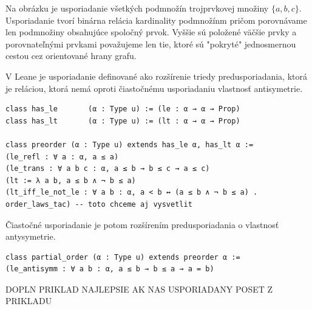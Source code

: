 \documentclass[a4paper,10pt,oneside]{report}%
\begin{document}
    Na obrázku je usporiadanie všetkých podmnožín trojprvkovej množiny $\{ a,b,c \}$.
    Usporiadanie tvorí binárna relácia kardinality podmnožínm pričom porovnávame
len podmnožiny obsahujúce spoločný prvok.
    Vyššie sú položené väčšie prvky a porovnateľnými prvkami považujeme len tie,
ktoré sú "pokryté" jednosmernou cestou cez orientované hrany grafu.

    V Leane je usporiadanie definované ako rozšírenie triedy predusporiadania, ktorá
je reláciou, ktorá nemá oproti čiastočnému usporiadaniu vlastnosť antisymetrie.

\begin{lstlisting}
class has_le       (α : Type u) := (le : α → α → Prop)
class has_lt       (α : Type u) := (lt : α → α → Prop)

class preorder (α : Type u) extends has_le α, has_lt α :=
(le_refl : ∀ a : α, a ≤ a)
(le_trans : ∀ a b c : α, a ≤ b → b ≤ c → a ≤ c)
(lt := λ a b, a ≤ b ∧ ¬ b ≤ a)
(lt_iff_le_not_le : ∀ a b : α, a < b ↔ (a ≤ b ∧ ¬ b ≤ a) . order_laws_tac) -- toto chceme aj vysvetlit
\end{lstlisting}
Čiastočné usporiadanie je potom rozšírením predusporiadania o vlastnosť antysymetrie.
\begin{lstlisting}
class partial_order (α : Type u) extends preorder α :=
(le_antisymm : ∀ a b : α, a ≤ b → b ≤ a → a = b)
\end{lstlisting}

DOPLN PRIKLAD NAJLEPSIE AK NAS USPORIADANY POSET Z PRIKLADU
\end{document}
